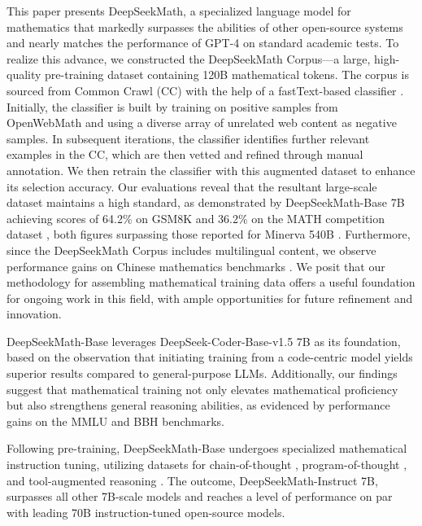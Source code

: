 This paper presents DeepSeekMath, a specialized language model for mathematics that markedly surpasses the abilities of other open-source systems and nearly matches the performance of GPT-4 on standard academic tests. To realize this advance, we constructed the DeepSeekMath Corpus—a large, high-quality pre-training dataset containing 120B mathematical tokens. The corpus is sourced from Common Crawl (CC) with the help of a fastText-based classifier \citep{joulin2016fasttext}. Initially, the classifier is built by training on positive samples from OpenWebMath \citep{openwebmath} and using a diverse array of unrelated web content as negative samples. In subsequent iterations, the classifier identifies further relevant examples in the CC, which are then vetted and refined through manual annotation. We then retrain the classifier with this augmented dataset to enhance its selection accuracy. Our evaluations reveal that the resultant large-scale dataset maintains a high standard, as demonstrated by DeepSeekMath-Base 7B achieving scores of 64.2\% on GSM8K \citep{gsm8k} and 36.2\% on the MATH competition dataset \citep{MATH}, both figures surpassing those reported for Minerva 540B \citep{minerva}. Furthermore, since the DeepSeekMath Corpus includes multilingual content, we observe performance gains on Chinese mathematics benchmarks \citep{wei2023cmath,agieval}. We posit that our methodology for assembling mathematical training data offers a useful foundation for ongoing work in this field, with ample opportunities for future refinement and innovation.

DeepSeekMath-Base leverages DeepSeek-Coder-Base-v1.5 7B \citep{deepseek-coder} as its foundation, based on the observation that initiating training from a code-centric model yields superior results compared to general-purpose LLMs. Additionally, our findings suggest that mathematical training not only elevates mathematical proficiency but also strengthens general reasoning abilities, as evidenced by performance gains on the MMLU \citep{mmlu} and BBH \citep{bbh} benchmarks.

Following pre-training, DeepSeekMath-Base undergoes specialized mathematical instruction tuning, utilizing datasets for chain-of-thought \citep{cot}, program-of-thought \citep{pot,pal}, and tool-augmented reasoning \citep{tora}. The outcome, DeepSeekMath-Instruct 7B, surpasses all other 7B-scale models and reaches a level of performance on par with leading 70B instruction-tuned open-source models.

